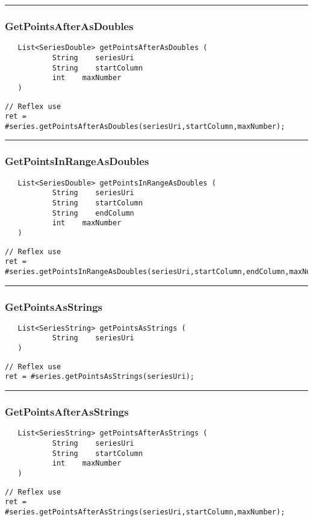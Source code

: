 \rule{15cm}{2pt}
\subsubsection{GetPointsAfterAsDoubles}
\label{Api:GetPointsAfterAsDoubles}
\begin{verbatim}
   List<SeriesDouble> getPointsAfterAsDoubles (
           String    seriesUri
           String    startColumn
           int    maxNumber
   )
\end{verbatim}
\begin{lstlisting}[language=reflex]
// Reflex use
ret = #series.getPointsAfterAsDoubles(seriesUri,startColumn,maxNumber);
\end{lstlisting}



\rule{15cm}{2pt}
\subsubsection{GetPointsInRangeAsDoubles}
\label{Api:GetPointsInRangeAsDoubles}
\begin{verbatim}
   List<SeriesDouble> getPointsInRangeAsDoubles (
           String    seriesUri
           String    startColumn
           String    endColumn
           int    maxNumber
   )
\end{verbatim}
\begin{lstlisting}[language=reflex]
// Reflex use
ret = #series.getPointsInRangeAsDoubles(seriesUri,startColumn,endColumn,maxNumber);
\end{lstlisting}



\rule{15cm}{2pt}
\subsubsection{GetPointsAsStrings}
\label{Api:GetPointsAsStrings}
\begin{verbatim}
   List<SeriesString> getPointsAsStrings (
           String    seriesUri
   )
\end{verbatim}
\begin{lstlisting}[language=reflex]
// Reflex use
ret = #series.getPointsAsStrings(seriesUri);
\end{lstlisting}



\rule{15cm}{2pt}
\subsubsection{GetPointsAfterAsStrings}
\label{Api:GetPointsAfterAsStrings}
\begin{verbatim}
   List<SeriesString> getPointsAfterAsStrings (
           String    seriesUri
           String    startColumn
           int    maxNumber
   )
\end{verbatim}
\begin{lstlisting}[language=reflex]
// Reflex use
ret = #series.getPointsAfterAsStrings(seriesUri,startColumn,maxNumber);
\end{lstlisting}



